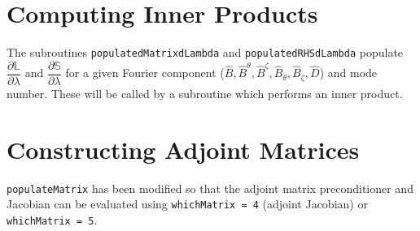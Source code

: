 \documentclass[11pt]{amsart}
\newcommand{\partder}[2]{\dfrac{\partial #1}{\partial #2}} %
\begin{document}
\section{Computing Inner Products}
The subroutines \texttt{populatedMatrixdLambda} and \texttt{populatedRHSdLambda} populate $\partder{\mathbb{L}}{\lambda}$ and $\partder{\mathbb{S}}{\lambda}$ for a given Fourier component ($\hat{B}, \hat{B}^{\theta}, \hat{B}^{\zeta}, \hat{B}_{\theta}, \hat{B}_{\zeta}, \hat{D}$) and mode number. These will be called by a subroutine which performs an inner product. 

\section{Constructing Adjoint Matrices}

\texttt{populateMatrix} has been modified so that the adjoint matrix preconditioner and Jacobian can be evaluated using \texttt{whichMatrix = 4} (adjoint Jacobian) or \texttt{whichMatrix = 5}. 
\end{document}
